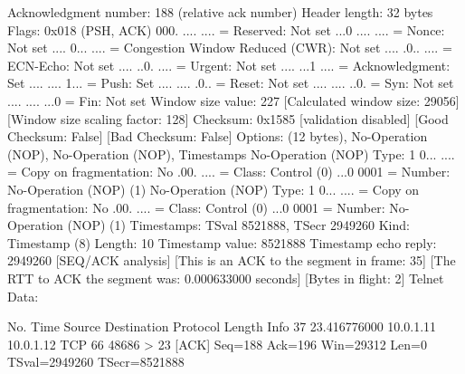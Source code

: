     Acknowledgment number: 188    (relative ack number)
    Header length: 32 bytes
    Flags: 0x018 (PSH, ACK)
        000. .... .... = Reserved: Not set
        ...0 .... .... = Nonce: Not set
        .... 0... .... = Congestion Window Reduced (CWR): Not set
        .... .0.. .... = ECN-Echo: Not set
        .... ..0. .... = Urgent: Not set
        .... ...1 .... = Acknowledgment: Set
        .... .... 1... = Push: Set
        .... .... .0.. = Reset: Not set
        .... .... ..0. = Syn: Not set
        .... .... ...0 = Fin: Not set
    Window size value: 227
    [Calculated window size: 29056]
    [Window size scaling factor: 128]
    Checksum: 0x1585 [validation disabled]
        [Good Checksum: False]
        [Bad Checksum: False]
    Options: (12 bytes), No-Operation (NOP), No-Operation (NOP), Timestamps
        No-Operation (NOP)
            Type: 1
                0... .... = Copy on fragmentation: No
                .00. .... = Class: Control (0)
                ...0 0001 = Number: No-Operation (NOP) (1)
        No-Operation (NOP)
            Type: 1
                0... .... = Copy on fragmentation: No
                .00. .... = Class: Control (0)
                ...0 0001 = Number: No-Operation (NOP) (1)
        Timestamps: TSval 8521888, TSecr 2949260
            Kind: Timestamp (8)
            Length: 10
            Timestamp value: 8521888
            Timestamp echo reply: 2949260
    [SEQ/ACK analysis]
        [This is an ACK to the segment in frame: 35]
        [The RTT to ACK the segment was: 0.000633000 seconds]
        [Bytes in flight: 2]
Telnet
    Data: 

No.     Time           Source                Destination           Protocol Length Info
     37 23.416776000   10.0.1.11             10.0.1.12             TCP      66     48686 > 23 [ACK] Seq=188 Ack=196 Win=29312 Len=0 TSval=2949260 TSecr=8521888

